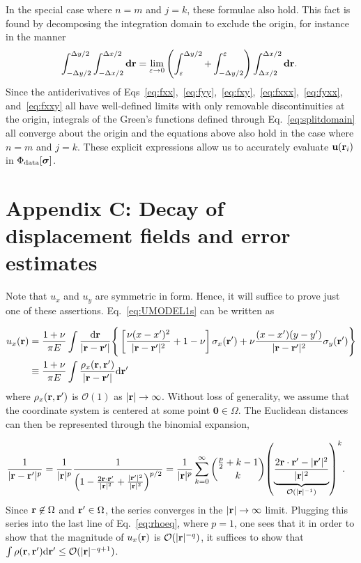 \documentclass[aps,prl,reprint,twocolumn,groupedaddress,showpacs]{revtex4-1}
\newcommand{\bsigma}{{\boldsymbol\sigma}}
\def\d{{\bf d}}
\def\dd{\mbox{d}}
\def\r{{\bf r}}
\def\u{{\bf u}}
\begin{document}
\begin{widetext}
In the special case where $n=m$ and $j=k$, these formulae also
hold. This fact is found by decomposing the integration domain to
exclude the origin, for instance in the manner
\begin{equation}
\int_{ -\Delta y/2 }^{\Delta y/2 }\int_{- \Delta x/2 }^{\Delta x/2 } \d\r = \lim_{\varepsilon\to0} \left( \int_\varepsilon^{\Delta y/2}  +  \int_{-\Delta y/2}^\varepsilon   \right)\int_{\Delta x/2}^{\Delta x/2} \d\r.~\label{eq:splitdomain}
\end{equation}
Since the antiderivatives of
Eqs~\ref{eq:fxx},~\ref{eq:fyy},~\ref{eq:fxy},~\ref{eq:fxxx},~\ref{eq:fyxx},
and~\ref{eq:fxxy} all have well-defined limits with only removable
discontinuities at the origin, integrals of the Green's functions
defined through Eq.~\ref{eq:splitdomain} all converge about the origin
and the equations above also hold in the case where $n=m$ and $j=k$.
These explicit expressions allow us to accurately evaluate
$\u(\r_{i})$ in $\Phi_{\rm data}[\bsigma]$.

\section{Appendix C: Decay of displacement fields and error estimates}

Note that $u_x$ and $u_y$ are symmetric in form. Hence, it will
suffice to prove just one of these assertions. Eq.~\ref{eq:UMODEL1s}
can be written as

\begin{align}
u_x(\r) & = \frac{1+\nu}{\pi E} \int \frac{\dd \r}{|\r-\r'|} 
\Bigg\{ \left[ \frac{\nu(x - x')^2}{|\r-\r'|^2} + 1-\nu \right]\sigma_{x}(\r') +\nu\frac{(x-x')(y-y')}{|\r-\r'|^2} \sigma_y(\r')  \Bigg\} \nonumber\\
& \equiv \frac{1+\nu}{\pi E}   \int\frac{\rho_x(\r,\r')}{|\r-\r'|} \dd \r'  \label{eq:rhoeq}
\end{align}
where $\rho_x(\r,\r')$ is $\mathcal{O}(1)$ as
$\vert\r\vert\to\infty$. Without loss of generality, we assume that
the coordinate system is centered at some point
$\mathbf{0}\in\Omega$. The Euclidean distances can then be represented
through the binomial expansion,

\begin{align}
\frac{1}{|\r-\r'|^p} &= \frac{1}{|\r|^p}\frac{1}{\left(1 - \frac{2\r\cdot\r'}{|\r|^2} 
+\frac{\vert\r'\vert^{2}}{\vert\r\vert^{2}}\right)^{p/2}} = \frac{1}{|\r|^p}\sum_{k=0}^\infty {{{p\over 2}+k-1}\choose{k}} 
{\left( \underbrace{ \frac{2\r\cdot\r' - |\r'|^2}{|\r|^2}}_{\mathcal{O}(|\r|^{-1})} \right)}^k.
\end{align}
% 
Since $\r\not\in\Omega$ and $\r'\in\Omega$, the series converges in
the $\vert \r\vert \to \infty$ limit. Plugging this series into the
last line of Eq.~\ref{eq:rhoeq}, where $p=1$, one sees that it in order to show
that the magnitude of $u_x(\r)$ is $\mathcal{O}(|\r|^{-q})$, it
suffices to show that $\int \rho(\r,\r')\dd\r' \leq
{\cal O}(|\r|^{-q+1})$.


\end{widetext}
\end{document}

